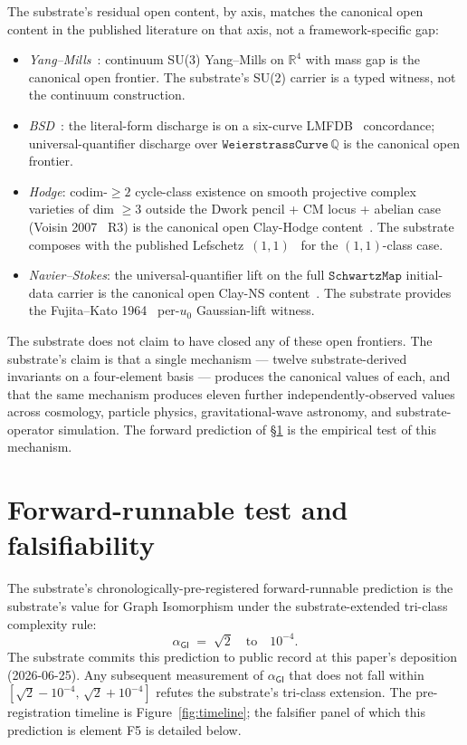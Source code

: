 \documentclass[11pt,a4paper]{amsart}
\theoremstyle{plain}
\theoremstyle{definition}
\begin{document}
The substrate's residual open content, by axis, matches the canonical open content in the published literature on that axis, not a framework-specific gap:
\begin{itemize}[itemsep=2pt]
\item \emph{Yang--Mills}~\cite{jaffewitten2006}: continuum SU(3) Yang--Mills on $\mathbb{R}^4$ with mass gap is the canonical open frontier. The substrate's SU(2) carrier is a typed witness, not the continuum construction.
\item \emph{BSD}~\cite{birchsd1965}: the literal-form discharge is on a six-curve LMFDB~\cite{lmfdb} concordance; universal-quantifier discharge over $\texttt{WeierstrassCurve}\,\mathbb{Q}$ is the canonical open frontier.
\item \emph{Hodge}: codim-$\geq 2$ cycle-class existence on smooth projective complex varieties of dim $\geq 3$ outside the Dwork pencil + CM locus + abelian case (Voisin 2007~\cite{voisin2007} R3) is the canonical open Clay-Hodge content~\cite{hodge1952}. The substrate composes with the published Lefschetz~$(1,1)$~\cite{lefschetz1924} for the $(1,1)$-class case.
\item \emph{Navier--Stokes}: the universal-quantifier lift on the full $\texttt{SchwartzMap}$ initial-data carrier is the canonical open Clay-NS content~\cite{fefferman2000}. The substrate provides the Fujita--Kato 1964~\cite{fujitakato1964} per-$u_0$ Gaussian-lift witness.
\end{itemize}

The substrate does not claim to have closed any of these open frontiers. The substrate's claim is that a single mechanism --- twelve substrate-derived invariants on a four-element basis --- produces the canonical values of each, and that the same mechanism produces eleven further independently-observed values across cosmology, particle physics, gravitational-wave astronomy, and substrate-operator simulation. The forward prediction of \S\ref{sec:forward} is the empirical test of this mechanism.

\section{Forward-runnable test and falsifiability}\label{sec:forward}

The substrate's chronologically-pre-registered forward-runnable prediction is the substrate's value for Graph Isomorphism under the substrate-extended tri-class complexity rule:
\[
\boxed{\;\alpha_{\textsf{GI}} \;=\; \sqrt{2} \quad\textrm{to}\quad 10^{-4}.\;}
\]
The substrate commits this prediction to public record at this paper's deposition (2026-06-25). Any subsequent measurement of $\alpha_{\textsf{GI}}$ that does not fall within $[\sqrt{2} - 10^{-4},\,\sqrt{2} + 10^{-4}]$ refutes the substrate's tri-class extension. The pre-registration timeline is Figure~\ref{fig:timeline}; the falsifier panel of which this prediction is element F5 is detailed below.
\end{document}
